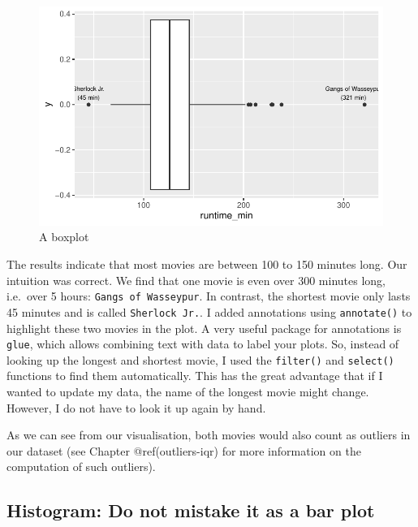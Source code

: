 \documentclass[
  letterpaper,
]{krantz}
\begin{document}
\begin{figure}[H]

{\centering \includegraphics{08_descriptive_statistics_files/figure-pdf/a-boxplot-1.pdf}

}

\caption{A boxplot}

\end{figure}%

The results indicate that most movies are between 100 to 150 minutes
long. Our intuition was correct. We find that one movie is even over 300
minutes long, i.e.~over 5 hours: \texttt{Gangs\ of\ Wasseypur}. In
contrast, the shortest movie only lasts 45 minutes and is called
\texttt{Sherlock\ Jr.}. I added annotations using \texttt{annotate()} to
highlight these two movies in the plot. A very useful package for
annotations is \texttt{glue}, which allows combining text with data to
label your plots. So, instead of looking up the longest and shortest
movie, I used the \texttt{filter()} and \texttt{select()} functions to
find them automatically. This has the great advantage that if I wanted
to update my data, the name of the longest movie might change. However,
I do not have to look it up again by hand.

As we can see from our visualisation, both movies would also count as
outliers in our dataset (see Chapter @ref(outliers-iqr) for more
information on the computation of such outliers).

\subsection{Histogram: Do not mistake it as a bar
plot}\label{histogram-do-not-mistake-it-as-a-bar-plot}
\end{document}
